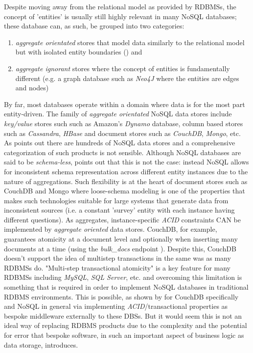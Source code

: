 Despite moving away from the relational model as provided by RDBMSs, the concept of 'entities' is usually still highly relevant in many NoSQL databases; these database can, as such, be grouped into two categories:

\begin{enumerate}
    \item \textit{aggregate orientated} stores that model data similarly to the relational model but with isolated entity boundaries (\cite{fowlerAggregate}) and
    \item \textit{aggregate ignorant} stores where the concept of entities is fundamentally different (e.g. a graph database such as \textit{Neo4J} where the entities are edges and nodes)
\end{enumerate}

By far, most databases operate within a domain where data is for the most part entity-driven. The family of \textit{aggregate orientated} NoSQL data stores include \textit{key/value} stores such such as Amazon's \textit{Dynamo} database, column based stores such as \textit{Cassandra}, \textit{HBase} and document stores such as \textit{CouchDB}, \textit{Mongo}, etc. As \cite{GANESHCHANDRA201513} points out there are hundreds of NoSQL data stores and a comprehensive categorization of such products is not sensible. Although NoSQL databases are said to be \textit{schema-less}, \cite{ATZENI2016} points out that this is not the case: instead NoSQL allows for inconsistent schema representation across different entity instances due to the nature of aggregations. Such flexibility is at the heart of document stores such as CouchDB and Mongo where loose-schema modeling is one of the properties that makes such technologies suitable for large systems that generate data from inconsistent sources (i.e. a constant 'survey' entity with each instance having different questions). As aggregates, instance-specific \textit{ACID} constraints CAN be implemented by \textit{aggregate oriented} data stores. CouchDB, for example, guarantees atomicity at a document level and optionally when inserting many documents at a time (using the \textit{bulk\_docs} endpoint \cite{bulkDocs}). Despite this, CouchDB doesn't support the idea of multistep transactions in the same was as many RDBMSs do. "Multi-step transactional atomicity" is a key feature for many RDBMSs including \textit{MySQL}, \textit{SQL Server}, etc. and overcoming this limitation is something that is required in order to implement NoSQL databases in traditional RDBMS environments. This is possible, as shown by \cite{Rashmi2017} for CouchDB specifically and NoSQL in general \cite{LOTFY2016133} via implementing \textit{ACID}/transactional properties as bespoke middleware externally to these DBSs. But it would seem this is not an ideal way of replacing RDBMS products due to the complexity and the potential for error that bespoke software, in such an important aspect of business logic as data storage, introduces.

